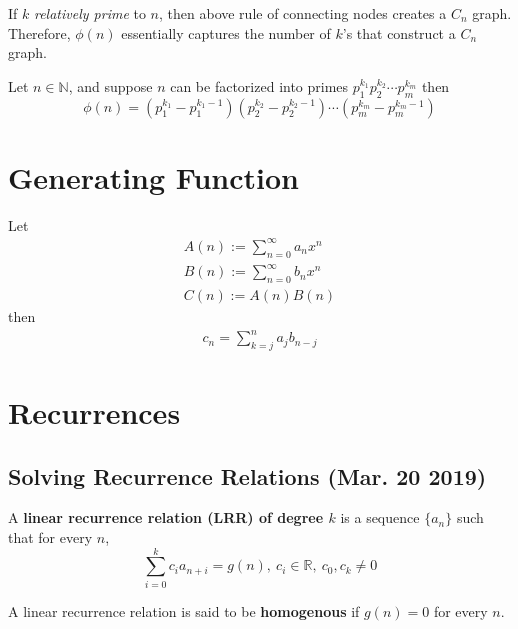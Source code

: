 \documentclass{article}
\def\R{{\mathbb R}}
\begin{document}
				\begin{theorem}
					If $k$ \emph{relatively prime} to $n$, then above rule of connecting nodes creates a $C_n$ graph. Therefore, $\phi(n)$ essentially captures the number of $k$'s that construct a $C_n$ graph.
				\end{theorem}
				
			\begin{theorem}
				Let $n \in \mathbb{N}$, and suppose $n$ can be factorized into primes $p_1^{k_1} p_2^{k_2} \cdots p_m^{k_m}$ then
				\[
					\phi(n) = (p_1^{k_1} - p_1^{k_1 - 1})(p_2^{k_2} - p_2^{k_2 - 1}) \cdots (p_m^{k_m} - p_m^{k_m - 1})
				\]
			\end{theorem}
			
		\section{Generating Function}
			\begin{theorem}
				Let 
				\begin{gather}
					A(n) := \sum_{n=0}^\infty a_n x^n \\
					B(n) := \sum_{n=0}^\infty b_n x^n \\
					C(n) := A(n) B(n)
				\end{gather}
				then
				\begin{gather}
					c_n = \sum_{k=j}^n a_j b_{n-j}
				\end{gather}
			\end{theorem}

		\section{Recurrences}
			\subsection{Solving Recurrence Relations (Mar. 20 2019)}
				\begin{definition}
					A \textbf{linear recurrence relation (LRR) of degree $k$} is a sequence $\{a_n\}$ such that for every $n$, 
					\begin{equation}
						\sum_{i=0}^k c_i a_{n+i} = g(n),\ c_i \in \R,\ c_0, c_k \neq 0
					\end{equation}
				\end{definition}
				
				\begin{definition}
					A linear recurrence relation is said to be \textbf{homogenous} if $g(n) = 0$ for every $n$.
				\end{definition}
				
\end{document}

